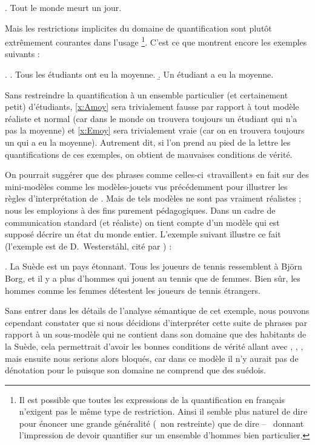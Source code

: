 \ex. \label{x:meurt1j}
Tout le monde meurt un jour.



Mais les restrictions implicites du domaine de quantification sont
plutôt extrêmement courantes dans l'usage%
\footnote{Il est possible que toutes les expressions de la
  quantification en français n'exigent pas le même type de
  restriction.  Ainsi il semble plus naturel de dire  pour énoncer une grande généralité (\ie\ non
  restreinte) que de dire  --~ donnant l'impression de devoir quantifier sur un
  ensemble d'hommes bien particulier.}.  C'est ce que montrent encore les
  exemples suivants :

\ex.
\a. 
Tous les étudiants ont eu la moyenne. \label{x:Amoy}
\b.
Un étudiant a eu la moyenne. \label{x:Emoy}


Sans restreindre la quantification à un ensemble particulier (et
certainement petit) d'étudiants, \ref{x:Amoy} sera trivialement
fausse par rapport à tout modèle réaliste et normal (car dans le monde
on trouvera toujours un étudiant qui n'a pas la moyenne) et
\ref{x:Emoy} sera trivialement vraie (car on en trouvera toujours un
qui a eu la moyenne).  Autrement dit, si l'on prend au pied de la
lettre les quantifications de ces exemples, on obtient de mauvaises
conditions de vérité.

On pourrait suggérer que des phrases comme celles-ci «travaillent»
en fait sur des mini-modèles comme les modèles-jouets vus précédemment
pour illustrer les règles d'interprétation de {\LO}.  Mais de tels
modèles ne sont pas vraiment 
réalistes ; nous les employions à des fins purement pédagogiques.  Dans un
cadre de communication standard (et réaliste) on tient compte d'un
modèle qui est supposé décrire un état du monde entier.  
L'exemple suivant illustre ce fait (l'exemple
est de D.~Westerst{\aa}hl, cité par \citet{vFintel:94}) :


\ex. \label{x:Westerst}
La Suède est un pays étonnant. Tous les joueurs de tennis ressemblent
à Bj\"orn Borg, et il y a plus d'hommes qui jouent au tennis que de
femmes.  Bien sûr, les hommes comme les femmes détestent les joueurs
de tennis étrangers.

\largerpage[-1]

Sans entrer dans les détails de l'analyse sémantique de cet exemple,
nous pouvons cependant constater que si nous décidions d'interpréter cette
suite de phrases par rapport à un sous-modèle qui ne contient dans son
domaine que des habitants de la Suède, cela permettrait d'avoir les
bonnes conditions de vérité allant avec , , , mais ensuite nous
serions alors bloqués, car dans ce modèle il n'y aurait pas de
dénotation pour le {\GN}  puisque
son domaine ne comprend que des suédois.

